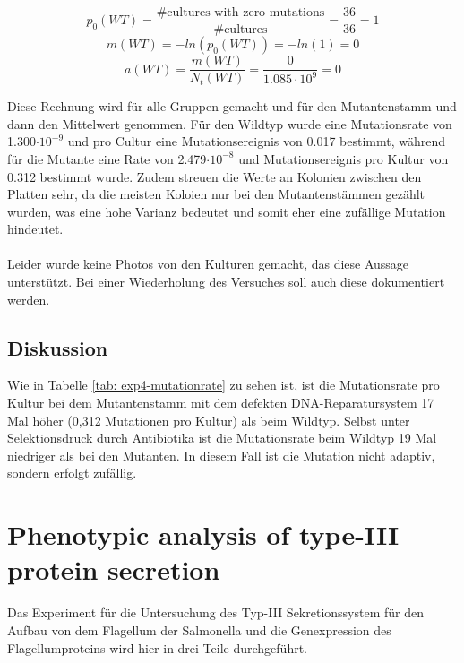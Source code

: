 \documentclass[oneside,10pt,a4paper]{report}
\begin{document}
		\begin{equation}\nonumber
			p_0 (WT)= \frac{\# \text{cultures with zero mutations}}{\#\text{cultures}} = \frac{36}{36} = 1
		\end{equation}
		\begin{equation}\nonumber
			m(WT) = -ln(p_0(WT)) = -ln(1) = 0
		\end{equation}
		\begin{equation}\nonumber
			a(WT) = \frac{m(WT)}{N_t(WT)} = \frac{0}{1.085 \cdot 10^9} = 0
		\end{equation}
		
		Diese Rechnung wird für alle Gruppen gemacht und für den Mutantenstamm und dann den Mittelwert genommen.
		Für den Wildtyp wurde eine Mutationsrate von  1.300$\cdot 10^{-9}$ und pro Cultur eine Mutationsereignis von 0.017 bestimmt, während für die Mutante  eine Rate von 2.479$\cdot 10^{-8}$ und Mutationsereignis pro Kultur von 0.312 bestimmt wurde. 
		Zudem streuen die Werte an Kolonien zwischen den Platten sehr, da die meisten Koloien nur bei den Mutantenstämmen gezählt wurden, was eine hohe Varianz bedeutet und somit eher eine zufällige Mutation hindeutet.\\
		\\
		Leider wurde keine Photos von den Kulturen gemacht, das diese Aussage unterstützt. Bei einer Wiederholung des Versuches soll auch diese dokumentiert werden.
		
		\section{Diskussion}
		
		Wie in Tabelle \ref{tab: exp4-mutationrate} zu sehen ist, ist die Mutationsrate pro Kultur bei dem Mutantenstamm mit dem defekten DNA-Reparatursystem 17 Mal höher (0,312 Mutationen pro Kultur) als beim Wildtyp.
		Selbst unter Selektionsdruck durch Antibiotika ist die Mutationsrate beim Wildtyp 19 Mal niedriger als bei den Mutanten.
		In diesem Fall ist die Mutation nicht adaptiv, sondern erfolgt zufällig.
	
	\chapter{Phenotypic analysis of type-III protein secretion}
		Das Experiment für die Untersuchung des Typ-III Sekretionssystem für den Aufbau von dem Flagellum der Salmonella und die Genexpression des Flagellumproteins wird hier in drei Teile durchgeführt.\\
\end{document}
